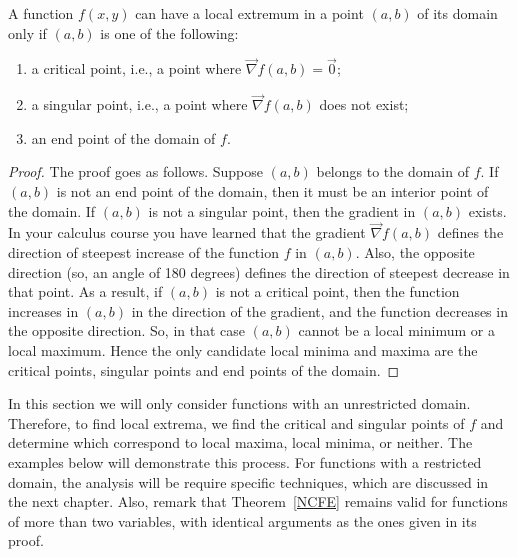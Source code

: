 \pagebreak
\begin{theorem}\label{NCFE}
A function $f(x,y)$ can have a local extremum in a point $(a,b)$ of its domain only if $(a,b)$ is one of the following:  
\begin{enumerate}
\item a critical point, i.e., a point where $\vec{\nabla} f(a,b)=\vec{0}$;
\item a singular point, i.e., a point where $\vec{\nabla} f(a,b)$ does not exist;
\item an end point of the domain of $f$.
\end{enumerate}
\end{theorem}

\ifanalysis

\begin{proof}
The proof goes as follows. Suppose $(a,b)$ belongs to the domain of $f$. If $(a,b)$ is not an end point of the domain, then it must be an interior point of the domain. If $(a,b)$ is not a singular point, then the gradient in $(a,b)$ exists.  
In your calculus course you have learned that the gradient $\vec{\nabla} f(a,b)$ defines the direction of steepest increase of the function $f $ in $(a,b)$. Also, the opposite direction (so, an angle of 180 degrees) defines the direction of steepest decrease in that point. As a result, if $(a,b)$ is not a critical point, then the function increases in $(a,b)$ in the direction of the gradient, and the function decreases in the opposite direction. So, in that case $(a,b)$ cannot be a local minimum or a local maximum. Hence the only candidate local minima and maxima are the critical points, singular points and end points of the domain.
\end{proof}

\fi

In this section we will only consider functions with an unrestricted domain. 
Therefore, to find local extrema, we find the critical and singular points of $f$ and determine which correspond to local maxima, local minima, or neither. The examples below will demonstrate this process. For functions with a restricted domain, the analysis will be require specific techniques, which are discussed in the next chapter. Also, remark that Theorem~\ref{NCFE} remains valid for functions of more than two variables, with identical arguments as the ones given in its proof. 

